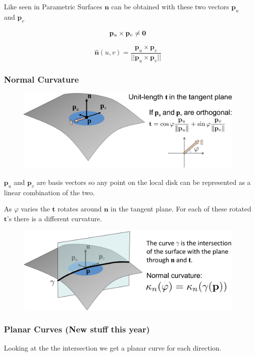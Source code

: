 \documentclass{article}
\begin{document}
Like seen in Parametric Surfaces \(\mathbf{n}\) can be obtained with these two vectors \(\mathbf{p}_{u}\) and
\(\mathbf{p}_{v}\)

\[
    \mathbf{p}_{u} \times \mathbf{p}_{v} \neq \mathbf{0}\\
\]

\[
    \mathbf{\hat{n}}(u,v) = \frac{\mathbf{p}_{u} \times \mathbf{p}_{v}}
    {||\mathbf{p}_{u} \times \mathbf{p}_{v}||}
\]

\newpage
\subsubsection{Normal Curvature}

\begin{figure}[!ht]
    \centering
    \includegraphics[width=0.6\linewidth]{images/curvature_1.png}
\end{figure}

\(\mathbf{p}_u\) and \(\mathbf{p}_v\) are basis vectors so any point on the local disk can be represented
as a linear combination of the two.

As \(\varphi\) varies the \(\mathbf{t}\) rotates around \(\mathbf{n}\) in the tangent plane. For each of these
rotated \(\mathbf{t}\)'s there is a different curvature.


\begin{figure}[!ht]
    \centering
    \includegraphics[width=0.6\linewidth]{images/curvature_2.png}
\end{figure}

\subsubsection{Planar Curves (New stuff this year)}

Looking at the the intersection we get a planar curve for each direction.
\end{document}
